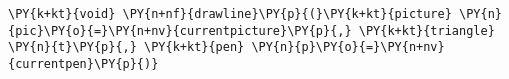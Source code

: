 \begin{Verbatim}[commandchars=\\\{\}]
    \PY{k+kt}{void} \PY{n+nf}{drawline}\PY{p}{(}\PY{k+kt}{picture} \PY{n}{pic}\PY{o}{=}\PY{n+nv}{currentpicture}\PY{p}{,} \PY{k+kt}{triangle} \PY{n}{t}\PY{p}{,} \PY{k+kt}{pen} \PY{n}{p}\PY{o}{=}\PY{n+nv}{currentpen}\PY{p}{)}
\end{Verbatim}
